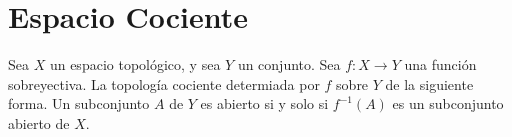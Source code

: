 \documentclass{./Topologia.tex}
\begin{document}
\chapter{Espacio Cociente}
\begin{defin}
    Sea \(X\) un espacio topológico, y sea \(Y\) un conjunto. Sea \(f:X \to Y\) una función
    sobreyectiva. La topología cociente determiada por \(f\) sobre \(Y\) de la siguiente forma.
    Un subconjunto \(A\) de \(Y\) es abierto si y solo si \(f^{-1}(A)\) es un subconjunto
    abierto de \(X\).
\end{defin}
\end{document}
